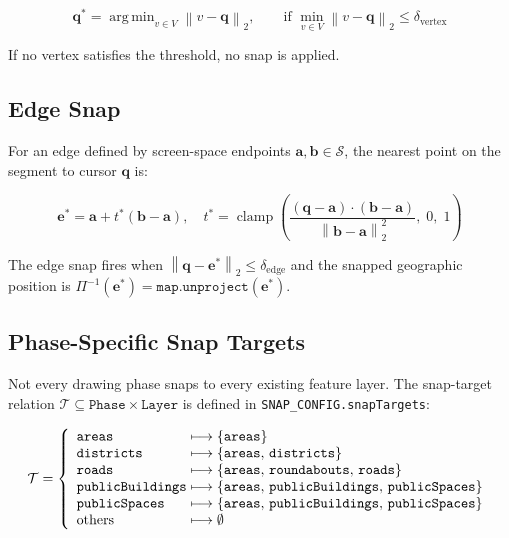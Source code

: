 \documentclass[12pt,a4paper]{article}
\theoremstyle{definition}
\theoremstyle{plain}
\theoremstyle{remark}
\newcommand{\norm}[1]{\left\lVert #1 \right\rVert}
\newcommand{\vect}[1]{\mathbf{#1}}
\DeclareMathOperator*{\argmin}{arg\,min}
\begin{document}
\begin{equation}
  \vect{q}^* = \argmin_{v \in V} \norm{v - \vect{q}}_2,
  \qquad \text{if } \min_{v \in V}\norm{v - \vect{q}}_2 \leq \delta_{\text{vertex}}
  \label{eq:vertex_snap}
\end{equation}

If no vertex satisfies the threshold, no snap is applied.

\subsection{Edge Snap}
\label{sec:edge_snap}

For an edge defined by screen-space endpoints $\vect{a}, \vect{b} \in \mathcal{S}$,
the nearest point on the segment to cursor $\vect{q}$ is:

\begin{equation}
  \vect{e}^* = \vect{a} + t^* (\vect{b} - \vect{a}), \quad
  t^* = \operatorname{clamp}\!\left(
    \frac{(\vect{q} - \vect{a}) \cdot (\vect{b} - \vect{a})}
         {\norm{\vect{b} - \vect{a}}_2^2},\; 0,\; 1
  \right)
  \label{eq:edge_snap}
\end{equation}

The edge snap fires when
$\norm{\vect{q} - \vect{e}^*}_2 \leq \delta_{\text{edge}}$
and the snapped geographic position is
$\Pi^{-1}(\vect{e}^*) = \texttt{map.unproject}(\vect{e}^*)$.

\subsection{Phase-Specific Snap Targets}

Not every drawing phase snaps to every existing feature layer. The
snap-target relation $\mathcal{T} \subseteq \texttt{Phase} \times
\texttt{Layer}$ is defined in \texttt{SNAP\_CONFIG.snapTargets}:

\begin{equation}
  \mathcal{T} = \left\{
  \begin{array}{l@{\;\longmapsto\;}l}
    \texttt{areas}         & \{\texttt{areas}\}                          \\
    \texttt{districts}     & \{\texttt{areas},\, \texttt{districts}\}    \\
    \texttt{roads}         & \{\texttt{areas},\, \texttt{roundabouts},\, \texttt{roads}\} \\
    \texttt{publicBuildings} & \{\texttt{areas},\, \texttt{publicBuildings},\, \texttt{publicSpaces}\} \\
    \texttt{publicSpaces}  & \{\texttt{areas},\, \texttt{publicBuildings},\, \texttt{publicSpaces}\} \\
    \text{others}          & \emptyset
  \end{array}
  \right.
  \label{eq:snap_targets}
\end{equation}
\end{document}

